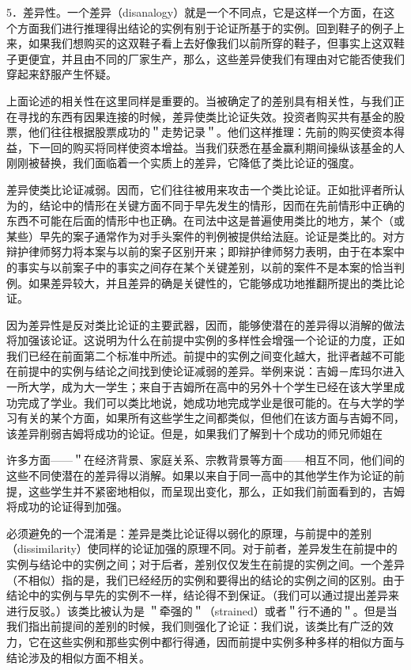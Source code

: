 5．差异性。一个差异（disanalogy）就是一个不同点，它是这样一个方面，在这个方面我们进行推理得出结论的实例有别于论证所基于的实例。回到鞋子的例子上来，如果我们想购买的这双鞋子看上去好像我们以前所穿的鞋子，但事实上这双鞋子更便宜，并且由不同的厂家生产，那么，这些差异使我们有理由对它能否使我们穿起来舒服产生怀疑。

上面论述的相关性在这里同样是重要的。当被确定了的差别具有相关性，与我们正在寻找的东西有因果连接的时候，差异使类比论证失效。投资者购买共有基金的股票，他们往往根据股票成功的＂走势记录＂。他们这样推理：先前的购买使资本得益，下一回的购买将同样使资本增益。当我们获悉在基金赢利期间操纵该基金的人刚刚被替换，我们面临着一个实质上的差异，它降低了类比论证的强度。

差异使类比论证减弱。因而，它们往往被用来攻击一个类比论证。正如批评者所认为的，结论中的情形在关键方面不同于早先发生的情形，因而在先前情形中正确的东西不可能在后面的情形中也正确。在司法中这是普遍使用类比的地方，某个（或某些）早先的案子通常作为对手头案件的判例被提供给法庭。论证是类比的。对方辩护律师努力将本案与以前的案子区别开来；即辩护律师努力表明，由于在本案中的事实与以前案子中的事实之间存在某个关键差别，以前的案件不是本案的恰当判例。如果差异较大，并且差异的确是关键性的，它能够成功地推翻所提出的类比论证。

因为差异性是反对类比论证的主要武器，因而，能够使潜在的差异得以消解的做法将加强该论证。这说明为什么在前提中实例的多样性会增强一个论证的力度，正如我们已经在前面第二个标准中所述。前提中的实例之间变化越大，批评者越不可能在前提中的实例与结论之间找到使论证减弱的差异。举例来说：吉姆－库玛尔进入一所大学，成为大一学生；来自于吉姆所在高中的另外十个学生已经在该大学里成功完成了学业。我们可以类比地说，她成功地完成学业是很可能的。在与大学的学习有关的某个方面，如果所有这些学生之间都类似，但他们在该方面与吉姆不同，该差异削弱吉姆将成功的论证。但是，如果我们了解到十个成功的师兄师姐在

许多方面——＂在经济背景、家庭关系、宗教背景等方面——相互不同，他们间的这些不同使潜在的差异得以消解。如果以来自于同一高中的其他学生作为论证的前提，这些学生并不紧密地相似，而呈现出变化，那么，正如我们前面看到的，吉姆将成功的论证得到加强。

必须避免的一个混淆是：差异是类比论证得以弱化的原理，与前提中的差别（dissimilarity）使同样的论证加强的原理不同。对于前者，差异发生在前提中的实例与结论中的实例之间；对于后者，差别仅仅发生在前提的实例之间。一个差异（不相似）指的是，我们已经经历的实例和要得出的结论的实例之间的区别。由于结论中的实例与早先的实例不一样，结论得不到保证。（我们可以通过提出差异来进行反驳。）该类比被认为是 ＂牵强的＂（strained）或者＂行不通的＂。但是当我们指出前提间的差别的时候，我们则强化了论证：我们说，该类比有广泛的效力，它在这些实例和那些实例中都行得通，因而前提中实例多种多样的相似方面与结论涉及的相似方面不相关。

